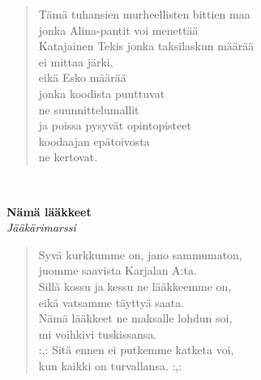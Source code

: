 \noindent\begin{minipage}{\linewidth}
\begin{verse}
	Tämä tuhansien murheellisten bittien maa\\
	jonka Alina-pantit voi menettää\\
	Katajainen Tekis jonka taksilaskun määrää\\
	ei mittaa järki,\\
	eikä Esko määrää\\
	jonka koodista puuttuvat\\
	ne suunnittelumallit\\
	ja poissa pysyvät opintopisteet\\
	koodaajan epätoivosta\\
	ne kertovat.\\
\end{verse}
\end{minipage}\\[10pt]
%
%
\noindent\begin{minipage}{\linewidth}
\vspace{5pt}
\parbox[t]{0.85\linewidth}{\raggedright {\large\bf Nämä lääkkeet}\\[2pt]\small\emph{Jääkärimarssi}\\[6pt]}
\begin{verse}
	
	Syvä kurkkumme on, jano sammumaton,\\
	juomme saavista Karjalan A:ta.\\
	Sillä kossu ja kessu ne lääkkeemme on,\\
	eikä vatsamme täyttyä saata.\\
	Nämä lääkkeet ne maksalle lohdun soi,\\
	mi voihkivi tuskissansa.\\
	\hspace{0pt-\widthof{:,: }}:,: Sitä ennen ei putkemme katketa voi,\\
	kun kaikki on turvallansa. :,:\\
\end{verse}
\end{minipage}\\[10pt]
%
%
